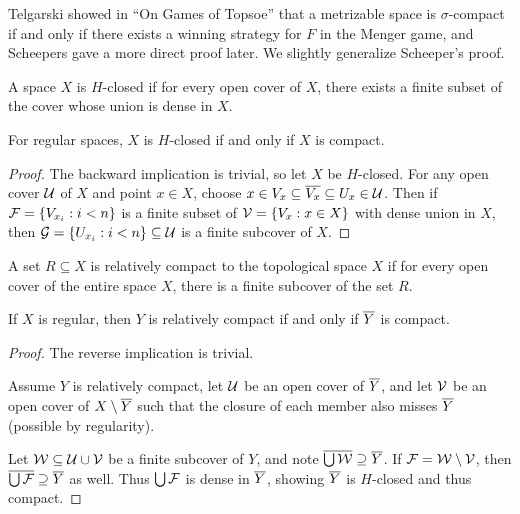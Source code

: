   Telgarski showed in ``On Games of Topsoe'' that a metrizable space is $\sigma$-compact if and only if there exists a winning strategy for $F$ in the Menger game, and Scheepers gave a more direct proof later. We slightly generalize Scheeper's proof.

  \begin{definition}
    A space $X$ is $H$-closed if for every open cover of $X$, there exists a finite subset of the cover whose union is dense in $X$.
  \end{definition}

  \begin{proposition}
    For regular spaces, $X$ is $H$-closed if and only if $X$ is compact.
  \end{proposition}

  \begin{proof}
    The backward implication is trivial, so let $X$ be $H$-closed. For any open cover $\mathcal{U}$ of $X$ and point $x\in X$, choose $x\in V_x\subseteq \overline{V_x}\subseteq U_x\in \mathcal{U}$. Then if $\mathcal{F} = \{V_{x_i}:i<n\}$ is a finite subset of $\mathcal{V}=\{V_x:x\in X\}$ with dense union in $X$, then $\mathcal{G} = \{U_{x_i}:i<n\}\subseteq \mathcal{U}$ is a finite subcover of $X$.
  \end{proof}

  \begin{definition}
    A set $R\subseteq X$ is relatively compact to the topological space $X$ if for every open cover of the entire space $X$, there is a finite subcover of the set $R$.
  \end{definition}

  \begin{proposition}
    If $X$ is regular, then $Y$ is relatively compact if and only if $\overline{Y}$ is compact.
  \end{proposition}

  \begin{proof}
    The reverse implication is trivial. 

    Assume $Y$ is relatively compact, let $\mathcal{U}$ be an open cover of $\overline{Y}$, and let $\mathcal{V}$ be an open cover of $X\setminus\overline{Y}$ such that the closure of each member also misses $\overline{Y}$ (possible by regularity).

    Let $\mathcal{W}\subseteq \mathcal{U} \cup \mathcal{V}$ be a finite subcover of $Y$, and note $\overline{\bigcup\mathcal{W}} \supseteq \overline{Y}$. If $\mathcal{F} = \mathcal{W} \setminus \mathcal{V}$, then $\overline{\bigcup\mathcal{F}} \supseteq \overline{Y}$ as well. Thus $\bigcup\mathcal{F}$ is dense in $\overline{Y}$, showing $\overline{Y}$ is $H$-closed and thus compact.
  \end{proof}

